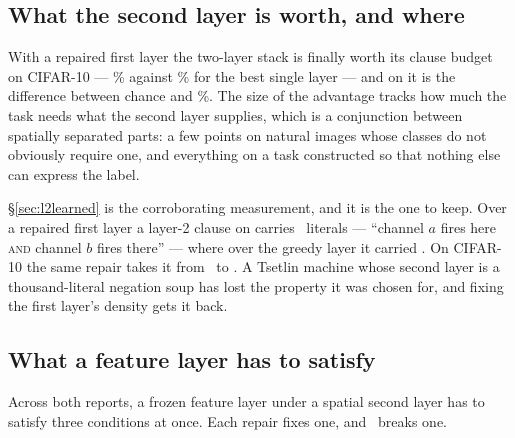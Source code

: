 \subsection{What the second layer is worth, and where}

With a repaired first layer the two-layer stack is finally worth its clause budget on CIFAR-10
--- \randBestAcc{}\% against \accSingleRf{}\% for the best single layer --- and on
 it is the difference between chance and \synNearAutoAuto{}\%. The size of the
advantage tracks how much the task needs what the second layer supplies, which is a conjunction
between spatially separated parts: a few points on natural images whose classes do not
obviously require one, and everything on a task constructed so that nothing else can express
the label.

\S\ref{sec:l2learned} is the corroborating measurement, and it is the one to keep. Over a
repaired first layer a layer-2 clause on  carries \synltwoNearCalibTask\ literals
--- ``channel $a$ fires here \textsc{and} channel $b$ fires there'' --- where over the greedy
layer it carried \synltwoNearMctmTask. On CIFAR-10 the same repair takes it from \sizeMctm\ to
\sizeMctmRandomCalib. A Tsetlin machine whose second layer is a thousand-literal negation soup
has lost the property it was chosen for, and fixing the first layer's density gets it back.

\subsection{What a feature layer has to satisfy}

Across both reports, a frozen feature layer under a spatial second layer has to satisfy three
conditions at once. Each repair fixes one, and \ideaC\ breaks one.

